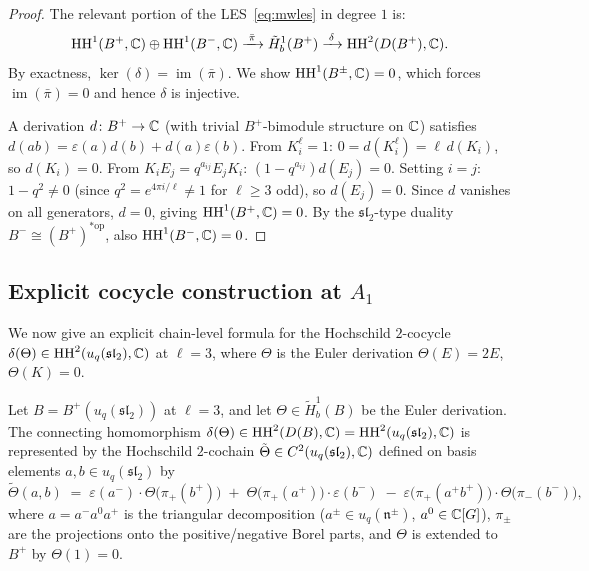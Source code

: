 \begin{proof}
The relevant portion of the LES~\eqref{eq:mwles} in degree $1$ is:
\[
\operatorname{HH}^1(B^+, \mathbb{C}) \oplus \operatorname{HH}^1(B^-, \mathbb{C}) \xrightarrow{\;\bar\pi\;} \tilde{H}^1_b(B^+) \xrightarrow{\;\delta\;} \operatorname{HH}^2(D(B^+), \mathbb{C}).
\]
By exactness, $\ker(\delta) = \operatorname{im}(\bar\pi)$. We show $\operatorname{HH}^1(B^\pm, \mathbb{C}) = 0$, which forces $\operatorname{im}(\bar\pi) = 0$ and hence $\delta$ is injective.

A derivation $d \colon B^+ \to \mathbb{C}$ (with trivial $B^+$-bimodule structure on $\mathbb{C}$) satisfies $d(ab) = \varepsilon(a) d(b) + d(a) \varepsilon(b)$. From $K_i^\ell = 1$: $0 = d(K_i^\ell) = \ell \, d(K_i)$, so $d(K_i) = 0$. From $K_i E_j = q^{a_{ij}} E_j K_i$: $(1 - q^{a_{ij}}) d(E_j) = 0$. Setting $i = j$: $1 - q^{2} \neq 0$ (since $q^2 = e^{4\pi i/\ell} \neq 1$ for $\ell \geq 3$ odd), so $d(E_j) = 0$. Since $d$ vanishes on all generators, $d = 0$, giving $\operatorname{HH}^1(B^+, \mathbb{C}) = 0$. By the $\mathfrak{sl}_2$-type duality $B^- \cong (B^+)^{* \mathrm{op}}$, also $\operatorname{HH}^1(B^-, \mathbb{C}) = 0$.
\end{proof}

\subsection{Explicit cocycle construction at \texorpdfstring{$A_1$}{A1}}
\label{sec:explicitcocycle}

We now give an explicit chain-level formula for the Hochschild $2$-cocycle $\delta(\Theta) \in \operatorname{HH}^2(u_q(\mathfrak{sl}_2), \mathbb{C})$ at $\ell = 3$, where $\Theta$ is the Euler derivation $\Theta(E) = 2E$, $\Theta(K) = 0$.

\begin{proposition}
\label{prop:explicitdelta}
Let $B = B^+(u_q(\mathfrak{sl}_2))$ at $\ell = 3$, and let $\Theta \in \tilde{H}^1_b(B)$ be the Euler derivation. The connecting homomorphism $\delta(\Theta) \in \operatorname{HH}^2(D(B), \mathbb{C}) = \operatorname{HH}^2(u_q(\mathfrak{sl}_2), \mathbb{C})$ is represented by the Hochschild $2$-cochain $\tilde\Theta \in C^2(u_q(\mathfrak{sl}_2), \mathbb{C})$ defined on basis elements $a, b \in u_q(\mathfrak{sl}_2)$ by
\begin{equation}
\label{eq:explicitdelta}
\tilde\Theta(a, b) \;=\; \varepsilon(a^-) \cdot \Theta\!\bigl(\pi_+(b^+)\bigr) \;+\; \Theta\!\bigl(\pi_+(a^+)\bigr) \cdot \varepsilon(b^-) \;-\; \varepsilon\!\bigl(\pi_+(a^+ b^+)\bigr) \cdot \Theta\!\bigl(\pi_-(b^-)\bigr),
\end{equation}
where $a = a^- a^0 a^+$ is the triangular decomposition ($a^\pm \in u_q(\mathfrak{n}^\pm)$, $a^0 \in \mathbb{C}[G]$), $\pi_\pm$ are the projections onto the positive/negative Borel parts, and $\Theta$ is extended to $B^+$ by $\Theta(1) = 0$.
\end{proposition}

